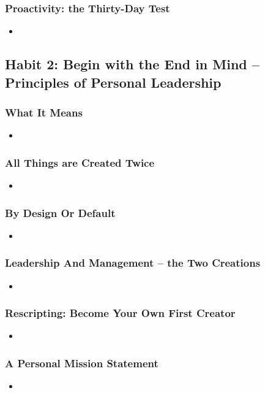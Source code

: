 \documentclass[11pt]{article}
\begin{document}
\subsubsection{Proactivity: the Thirty-Day Test}
\begin{itemize}
\item 
\end{itemize}
\subsection{Habit 2: Begin with the End in Mind -- Principles of Personal Leadership}
\subsubsection{What It Means}
\begin{itemize}
\item 
\end{itemize}
\subsubsection{All Things are Created Twice}
\begin{itemize}
\item 
\end{itemize}
\subsubsection{By Design Or Default}
\begin{itemize}
\item 
\end{itemize}
\subsubsection{Leadership And Management -- the Two Creations}
\begin{itemize}
\item 
\end{itemize}
\subsubsection{Rescripting: Become Your Own First Creator}
\begin{itemize}
\item 
\end{itemize}
\subsubsection{A Personal Mission Statement}
\begin{itemize}
\item 
\end{itemize}
\end{document}
